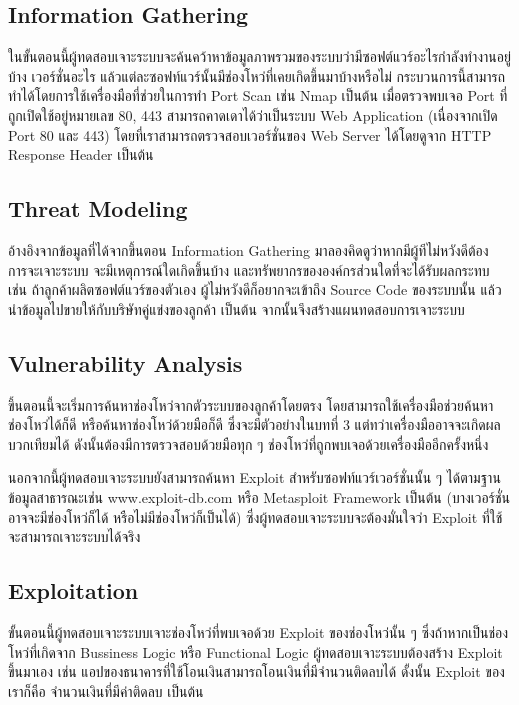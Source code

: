\subsection{Information Gathering}

ในขั้นตอนนี้ผู้ทดสอบเจาะระบบจะค้นคว้าหาข้อมูลภาพรวมของระบบว่ามีซอฟต์แวร์อะไรกำลังทำงานอยู่บ้าง เวอร์ชั่นอะไร แล้วแต่ละซอฟท์แวร์นั้นมีช่องโหว่ที่เคยเกิดขึ้นมาบ้างหรือไม่ กระบวนการนี้สามารถทำได้โดยการใช้เครื่องมือที่ช่วยในการทำ Port Scan\cite{shaw2015nmap} เช่น Nmap\cite{shaw2015nmap} เป็นต้น เมื่อตรวจพบเจอ Port\cite{wiki:port}  ที่ถูกเปิดใช้อยู่หมายเลข 80, 443 สามารถคาดเดาได้ว่าเป็นระบบ Web Application (เนื่องจากเปิด Port 80 และ 443) โดยที่เราสามารถตรวจสอบเวอร์ชั่นของ Web Server ได้โดยดูจาก HTTP Response Header เป็นต้น

\subsection{Threat Modeling}

อ้างอิงจากข้อมูลที่ได้จากขึ้นตอน Information Gathering มาลองคิดดูว่าหากมีผู้ทีไม่หวังดีต้อง
การจะเจาะระบบ จะมีเหตุการณ์ใดเกิดขึ้นบ้าง และทรัพยากรขององค์กรส่วนใดที่จะได้รับผลกระทบ เช่น ถ้าลูกค้าผลิตซอฟต์แวร์ของตัวเอง ผู้ไม่หวังดีก็อยากจะเข้าถึง Source Code ของระบบนั้น แล้วนำข้อมูลไปขายให้กับบริษัทคู่แข่งของลูกค้า เป็นต้น จากนั้นจึงสร้างแผนทดสอบการเจาะระบบ

\subsection{Vulnerability Analysis}

ขึ้นตอนนี้จะเริ่มการค้นหาช่องโหว่จากตัวระบบของลูกค้าโดยตรง โดยสามารถใช้เครื่องมือช่วยค้นหาช่องโหว่ได้ก็ดี หรือค้นหาช่องโหว่ด้วยมือก็ดี ซึ่งจะมีตัวอย่างในบทที่ 3 แต่ทว่าเครื่องมืออาจจะเกิดผลบวกเทียมได้ ดังนั้นต้องมีการตรวจสอบด้วยมือทุก ๆ ช่องโหว่ที่ถูกพบเจอด้วยเครื่องมืออีกครั้งหนึ่ง

นอกจากนี้ผู้ทดสอบเจาะระบบยังสามารถค้นหา Exploit สำหรับซอฟท์แวร์เวอร์ชั่นนั้น ๆ ได้ตามฐานข้อมูลสาธารณะเช่น www.exploit-db.com\cite{wiki:exploitdb}  หรือ Metasploit Framework\cite{wiki:msf} เป็นต้น (บางเวอร์ชั่นอาจจะมีช่องโหว่ก็ได้ หรือไม่มีช่องโหว่ก็เป็นได้) ซึ่งผู้ทดสอบเจาะระบบจะต้องมั่นใจว่า Exploit ที่ใช้จะสามารถเจาะระบบได้จริง

\subsection{Exploitation}

ขั้นตอนนี้ผู้ทดสอบเจาะระบบเจาะช่องโหว่ที่พบเจอด้วย Exploit ของช่องโหว่นั้น ๆ ซึ่งถ้าหากเป็นช่องโหว่ที่เกิดจาก Bussiness Logic หรือ Functional Logic ผู้ทดสอบเจาะระบบต้องสร้าง Exploit ขึ้นมาเอง เช่น แอปของธนาคารที่ใช้โอนเงินสามารถโอนเงินที่มีจำนวนติดลบได้ ดั้งนั้น Exploit ของเราก็คือ จำนวนเงินที่มีค่าติดลบ เป็นต้น 


